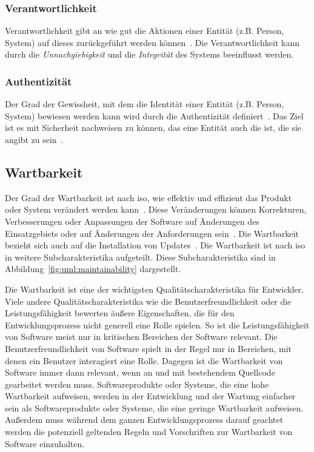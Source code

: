 \documentclass[12pt, a4paper, ngerman]{article}
\begin{document}
\subsubsection{Verantwortlichkeit}

Verantwortlichkeit gibt an wie gut die Aktionen einer Entität (z.B. Person, System) auf dieses zurückgeführt werden können~\cite{ISO25010}.
Die Verantwortlichkeit kann durch die \emph{Unnachgiebigkeit} und die \emph{Integrität} des Systems beeinflusst werden. 

\subsubsection{Authentizität}
Der Grad der Gewissheit, mit dem die Identität einer Entität (z.B. Person, System) 
bewiesen werden kann wird durch die Authentizität definiert~\cite{ISO25010}.
Das Ziel ist es mit Sicherheit nachweisen zu können, das eine Entität auch die ist, die sie angibt zu sein~\cite{ISO27000}.

\subsection{Wartbarkeit}
\label{sec:wartbarkeit}

Der Grad der Wartbarkeit ist nach \ac{iso},
wie effektiv und effizient das Produkt oder System verändert werden kann~\cite{ISO25010}.
Diese Veränderungen können Korrekturen, Verbesserungen
oder Anpassungen der Software auf Änderungen des Einsatzgebiets
oder auf Änderungen der Anforderungen sein~\cite{ISO25010}.
Die Wartbarkeit bezieht sich auch auf die Installation von Updates~\cite{ISO25010}.
Die Wartbarkeit ist nach \ac{iso} in weitere Subcharakteristika aufgeteilt.
Diese Subcharakteristika sind in Abbildung~\ref{fig:uml:maintainability} dargestellt.

Die Wartbarkeit ist eine der wichtigsten Qualitätscharakteristika für Entwickler.
Viele andere Qualitätscharakteristika wie 
die Benutzerfreundlichkeit oder die Leistungsfähigkeit
bewerten äußere Eigenschaften,
die für den Entwicklungsprozess nicht generell eine Rolle spielen.
So ist die Leistungsfähigkeit von Software 
meist nur in kritischen Bereichen der Software relevant.
Die Benutzerfreundlichkeit von Software spielt 
in der Regel nur in Bereichen, mit denen ein Benutzer interagiert eine Rolle.
Dagegen ist die Wartbarkeit von Software
immer dann relevant, 
wenn an und mit bestehendem Quellcode gearbeitet werden muss.
Softwareprodukte oder Systeme,
die eine hohe Wartbarkeit aufweisen,
werden in der Entwicklung und der Wartung einfacher sein
als Softwareprodukte oder Systeme,
die eine geringe Wartbarkeit aufweisen.
Außerdem muss während dem ganzen Entwicklungsprozess
darauf geachtet werden die potenziell geltenden 
Regeln und Vorschriften zur Wartbarkeit von Software einzuhalten.
\end{document}
